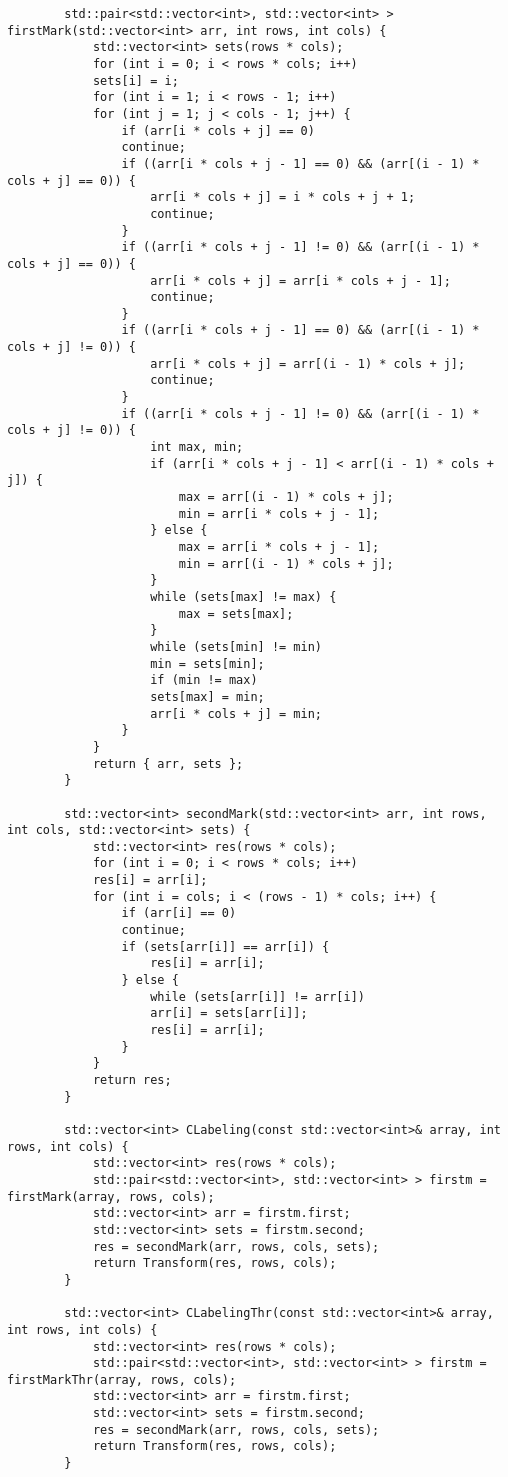 \documentclass{report}
\begin{document}
\begin{lstlisting}
	    std::pair<std::vector<int>, std::vector<int> > firstMark(std::vector<int> arr, int rows, int cols) {
	    	std::vector<int> sets(rows * cols);
	    	for (int i = 0; i < rows * cols; i++)
	    	sets[i] = i;
	    	for (int i = 1; i < rows - 1; i++)
	    	for (int j = 1; j < cols - 1; j++) {
	    		if (arr[i * cols + j] == 0)
	    		continue;
	    		if ((arr[i * cols + j - 1] == 0) && (arr[(i - 1) * cols + j] == 0)) {
	    			arr[i * cols + j] = i * cols + j + 1;
	    			continue;
	    		}
	    		if ((arr[i * cols + j - 1] != 0) && (arr[(i - 1) * cols + j] == 0)) {
	    			arr[i * cols + j] = arr[i * cols + j - 1];
	    			continue;
	    		}
	    		if ((arr[i * cols + j - 1] == 0) && (arr[(i - 1) * cols + j] != 0)) {
	    			arr[i * cols + j] = arr[(i - 1) * cols + j];
	    			continue;
	    		}
	    		if ((arr[i * cols + j - 1] != 0) && (arr[(i - 1) * cols + j] != 0)) {
	    			int max, min;
	    			if (arr[i * cols + j - 1] < arr[(i - 1) * cols + j]) {
	    				max = arr[(i - 1) * cols + j];
	    				min = arr[i * cols + j - 1];
	    			} else {
	    				max = arr[i * cols + j - 1];
	    				min = arr[(i - 1) * cols + j];
	    			}
	    			while (sets[max] != max) {
	    				max = sets[max];
	    			}
	    			while (sets[min] != min)
	    			min = sets[min];
	    			if (min != max)
	    			sets[max] = min;
	    			arr[i * cols + j] = min;
	    		}
	    	}
	    	return { arr, sets };
	    }
	    
	    std::vector<int> secondMark(std::vector<int> arr, int rows, int cols, std::vector<int> sets) {
	    	std::vector<int> res(rows * cols);
	    	for (int i = 0; i < rows * cols; i++)
	    	res[i] = arr[i];
	    	for (int i = cols; i < (rows - 1) * cols; i++) {
	    		if (arr[i] == 0)
	    		continue;
	    		if (sets[arr[i]] == arr[i]) {
	    			res[i] = arr[i];
	    		} else {
	    			while (sets[arr[i]] != arr[i])
	    			arr[i] = sets[arr[i]];
	    			res[i] = arr[i];
	    		}
	    	}
	    	return res;
	    }
	    
	    std::vector<int> CLabeling(const std::vector<int>& array, int rows, int cols) {
	    	std::vector<int> res(rows * cols);
	    	std::pair<std::vector<int>, std::vector<int> > firstm = firstMark(array, rows, cols);
	    	std::vector<int> arr = firstm.first;
	    	std::vector<int> sets = firstm.second;
	    	res = secondMark(arr, rows, cols, sets);
	    	return Transform(res, rows, cols);
	    }
	    
	    std::vector<int> CLabelingThr(const std::vector<int>& array, int rows, int cols) {
	    	std::vector<int> res(rows * cols);
	    	std::pair<std::vector<int>, std::vector<int> > firstm = firstMarkThr(array, rows, cols);
	    	std::vector<int> arr = firstm.first;
	    	std::vector<int> sets = firstm.second;
	    	res = secondMark(arr, rows, cols, sets);
	    	return Transform(res, rows, cols);
	    }
	    

\end{lstlisting}
\end{document}
